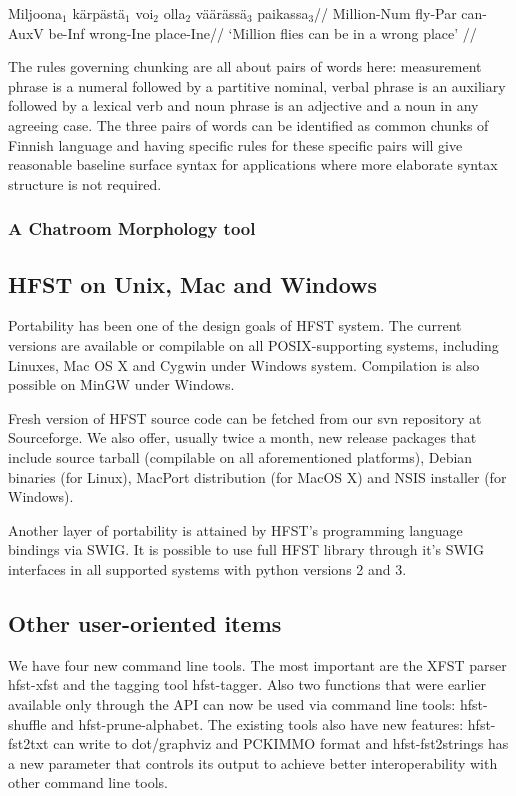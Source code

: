\documentclass{llncs}
\begin{document}
\ex
\begingl
\gla Miljoona$_1$ kärpästä$_1$ voi$_2$ olla$_2$ väärässä$_3$ paikassa$_3$//
\glb Million-{\sc Num} fly-{\sc Par} can-{\sc AuxV} be-{\sc Inf} wrong-{\sc Ine} place-{\sc Ine}//
\glft `Million flies can be in a wrong place' //
\endgl
\xe

The rules governing chunking are all about pairs of words here: measurement
phrase is a numeral followed by a partitive nominal, verbal phrase is an
auxiliary followed by a lexical verb and noun phrase is an adjective and a noun
in any agreeing case.  The three pairs of words can be identified as common
chunks of Finnish language and having specific rules for these specific pairs
will give reasonable baseline surface syntax for applications where more
elaborate syntax structure is not required.

\subsubsection{A Chatroom Morphology tool}

\subsection{HFST on Unix, Mac and Windows}

Portability has been one of the design goals of HFST system. The
current versions are available or compilable on all POSIX-supporting
systems, including Linuxes, Mac OS X and Cygwin under Windows
system. Compilation is also possible on MinGW under Windows.

Fresh version of HFST source code can be fetched from our svn
repository at Sourceforge. We also offer, usually twice a month, new
release packages that include source tarball (compilable on all
aforementioned platforms), Debian binaries (for Linux), MacPort
distribution (for MacOS X) and NSIS installer (for Windows).

Another layer of portability is attained by HFST's programming
language bindings via SWIG. It is possible to use full HFST library
through it's SWIG interfaces in all supported systems with python
versions 2 and 3.


\subsection{Other user-oriented items}

We have four new command line tools. The most important are the XFST
parser hfst-xfst and the tagging tool hfst-tagger. Also two functions
that were earlier available only through the API can now be used via
command line tools: hfst-shuffle and hfst-prune-alphabet. The existing
tools also have new features: hfst-fst2txt can write to dot/graphviz
and PCKIMMO format and hfst-fst2strings has a new parameter that
controls its output to achieve better interoperability with other
command line tools.
\end{document}
